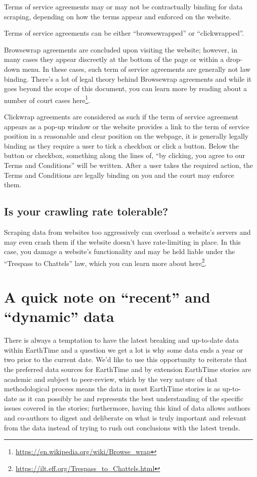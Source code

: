 \documentclass[
]{krantz}
\renewcommand{\href}[2]{#2\footnote{\url{#1}}}
\begin{document}
Terms of service agreements may or may not be contractually binding for data scraping, depending on how the terms appear and enforced on the website.

Terms of service agreements can be either ``browsewrapped'' or ``clickwrapped''.

Browsewrap agreements are concluded upon visiting the website; however, in many cases they appear discreetly at the bottom of the page or within a drop-down menu. In these cases, such term of service agreements are generally not law binding. There's a lot of legal theory behind Browsewrap agreements and while it goes beyond the scope of this document, you can learn more by reading about a number of court cases \href{https://en.wikipedia.org/wiki/Browse_wrap}{here}.

Clickwrap agreements are considered as such if the term of service agreement appears as a pop-up window or the website provides a link to the term of service position in a reasonable and clear position on the webpage, it is generally legally binding as they require a user to tick a checkbox or click a button. Below the button or checkbox, something along the lines of, ``by clicking, you agree to our Terms and Conditions'' will be written. After a user takes the required action, the Terms and Conditions are legally binding on you and the court may enforce them.

\hypertarget{is-your-crawling-rate-tolerable}{%
\subsection*{Is your crawling rate tolerable?}\label{is-your-crawling-rate-tolerable}}


Scraping data from websites too aggressively can overload a website's servers and may even crash them if the website doesn't have rate-limiting in place. In this case, you damage a website's functionality and may be held liable under the ``Trespass to Chattels'' law, which you can learn more about \href{https://ilt.eff.org/Trespass_to_Chattels.html}{here}.

\hypertarget{a-quick-note-on-recent-and-dynamic-data}{%
\section{A quick note on ``recent'' and ``dynamic'' data}\label{a-quick-note-on-recent-and-dynamic-data}}

There is always a temptation to have the latest breaking and up-to-date data within EarthTime and a question we get a lot is why some data ends a year or two prior to the current date. We'd like to use this opportunity to reiterate that the preferred data sources for EarthTime and by extension EarthTime stories are academic and subject to peer-review, which by the very nature of that methodological process means the data in most EarthTime stories is as up-to-date as it can possibly be and represents the best understanding of the specific issues covered in the stories; furthermore, having this kind of data allows authors and co-authors to digest and deliberate on what is truly important and relevant from the data instead of trying to rush out conclusions with the latest trends.
\end{document}
